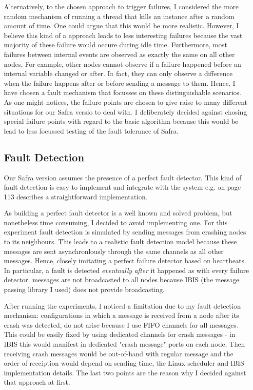 	Alternatively, to the chosen approach to trigger failures, I considered the more random mechanism of running a thread that kills an instance after a random amount of time.
	One could argue that this would be more realistic.
	However, I believe this kind of a approach leads to less interesting failures because the vast majority of these failure would occure during idle time. 
	Furthermore, most failures between internal events are observed as exactly the same on all other nodes. 
	For example, other nodes cannot observe if a failure happened before an internal variable changed or after. 
	In fact, they can only observe a difference when the failure happens after or before sending a message to them.
	Hence, I have chosen a fault mechanism that focusses on these distinguishable scenarios.
	As one might notices, the failure points are chosen to give raise to many different situations for our Safra versio to deal with. 
	I deliberately decided against chosing special failure points with regard to the basic algorithm because this would be lead to less focussed testing of the fault tolerance of Safra.
	
\subsection{Fault Detection}
Our Safra version assumes the presence of a perfect fault detector.
This kind of fault detection is easy to implement and integrate with the system e.g.
\cite{fokkink:2018} on page 113 describes a straightforward implementation.

As building a perfect fault detector is a well known and solved problem, but nonetheless time consuming, I decided to avoid implementing one.
For this experiment fault detection is simulated by sending  messages from crashing nodes to its neighbours. 
This leads to a realistic fault detection model because these messages are sent asynchronlously through the same channels as all other messages. 
Hence, closely imitating a perfect failure detector based on heartbeats. 
In particular, a fault is detected \textit{eventually after} it happened as with every failure detector.
 messages are not broadcasted to all nodes because IBIS (the message passing library I used) does not provide broadcasting.

After running the experiments, I noticed a limitation due to my fault detection mechanism:
configurations in which a message is received from a node after its crash was detected, do not arise because I use FIFO channels for all messages.  %
This could be easily fixed by using dedicated channels for crash messages - in IBIS this would manifest in dedicated "crash message" ports on each node.
Then receiving crash messages would be out-of-band with regular message and the order of receiption would depend on sending time, the Linux scheduler and IBIS implementation details.
The last two points are the reason why I decided against that approach at first.

